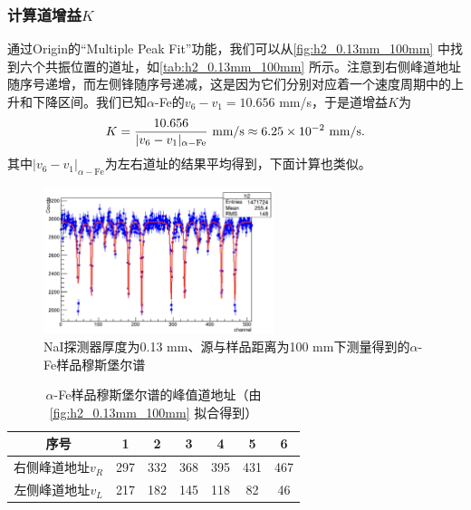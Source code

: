 \documentclass[font=default]{mpltx}
\begin{document}
\subsubsection{计算道增益$K$}
通过Origin的``Multiple Peak Fit''功能，我们可以从\autoref{fig:h2_0.13mm_100mm} 中找到六个共振位置的道址，如\autoref{tab:h2_0.13mm_100mm} 所示。注意到右侧峰道地址随序号递增，而左侧锋随序号递减，这是因为它们分别对应着一个速度周期中的上升和下降区间。我们已知$\alpha$-Fe的$v_6-v_1=10.656$ mm/s，于是道增益$K$为
$$K=\frac{10.656}{|v_6-v_1|_{\alpha-\text{Fe}}}\ \text{mm/s}\approx6.25\times10^{-2}\ {\rm mm/s}.$$
其中$|v_6-v_1|_{\alpha-\text{Fe}}$为左右道址的结果平均得到，下面计算也类似。
\begin{figure}[h]
  \centering
  \includegraphics[width=0.6\textwidth]{fig/DetThick/0.13mm/h2.png}
  \caption{NaI探测器厚度为0.13 mm、源与样品距离为100 mm下测量得到的$\alpha$-Fe样品穆斯堡尔谱}
  \label{fig:h2_0.13mm_100mm} 
\end{figure}
\begin{table}[h]
  \centering
  \caption{$\alpha$-Fe样品穆斯堡尔谱的峰值道地址（由\autoref{fig:h2_0.13mm_100mm} 拟合得到）}
  \vspace{0.2cm}
  \label{tab:h2_0.13mm_100mm}
  \begin{tabular}{c|cccccc}
    \hline
    序号 & 1 & 2 & 3 & 4 & 5 & 6 \\\hline
		右侧峰道地址$v_R$ &	297 & 332 & 368 & 395 & 431 & 467 \\
		左侧峰道地址$v_L$ &	217 & 182 & 145 & 118 & 82 & 46 \\
    \hline
  \end{tabular}
\end{table}
\end{document}
